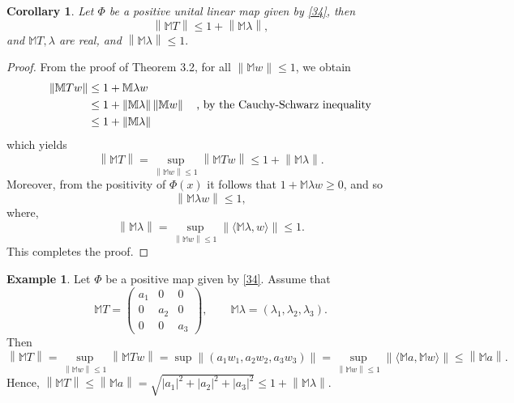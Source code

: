 \documentclass[11pt,reqno]{amsart}
\newtheorem{corollary}[subsection]{Corollary}
\theoremstyle{definition}
\newtheorem{example}{Example}
\numberwithin{equation}{section} \setcounter{tocdepth}{1}
\def\bm{{\mathbb M}}
\newcommand{\norm}[1]{\left \lVert #1 \right \rVert}
\newcommand{\innerproduct}[1]{\langle #1 \rangle}
\numberwithin{equation}{section}
\begin{document}
\begin{corollary}
     Let $\Phi$ be a positive unital linear map given by \eqref{34}, then
     \begin{equation}
         \norm{\bm{T}}\leq 1+\norm{\bm{\lambda}},
     \end{equation} and $\bm{T, \lambda}$ are real, and $\norm{\bm{\lambda}}\leq 1.$
\end{corollary}
\begin{proof}
    From the proof of Theorem 3.2, for all $\|\bm{w}\|\leq 1$, we obtain
    \begin{align}
          \norm{\bm{Tw}}&\leq 1+\bm{\lambda w} \notag \\
                  &\leq 1+ \norm{\bm{\lambda}}\norm{\bm{w}} \quad \text{, by the Cauchy-Schwarz inequality} \notag\\
          &\leq 1+\norm{\bm{\lambda}} \notag
      \end{align}
  which yields $$\norm{\bm{T}}=\sup_{\norm{\bm{w}}\leq1} \norm{\bm{Tw}} \leq 1+\norm{\bm{\lambda}}.$$
      Moreover, from the positivity of $\Phi(x)$ it follows that  $1+\bm{\lambda w}\geq 0$, and so
      \begin{equation}
          \norm{\bm{\lambda w}} \leq 1,
      \end{equation} where,
      $$ \norm{\bm{\lambda}}=\sup_{\norm{\bm{w}}\leq 1} \norm{\innerproduct{\bm{\lambda,w}}}\leq 1.$$
      This completes the proof.
\end{proof}

\begin{example}
    Let $\Phi$ be a positive map given by \eqref{34}.  Assume that
    \begin{equation}
        \bm{T}=\begin{pmatrix}
    a_1 & 0 & 0\\
    0 & a_2 & 0\\
    0 & 0 & a_3
    \end{pmatrix}, \qquad \bm{\lambda}=(\lambda_1,\lambda_2, \lambda_3).
    \end{equation}
    Then
    \begin{equation}
        \norm{\bm{T}}=\sup_{\norm{\bm{w}} \leq 1} \norm{\bm{Tw}}= \sup \norm{(a_1w_1,a_2w_2,a_3w_3)}=\sup_{\norm{\bm{w}}\leq 1} \norm{ \langle \bm{a}, \bm{w} \rangle} \leq \norm{\bm{a}}.
    \end{equation} Hence, $\norm{\bm{T}} \leq \norm{\bm{a}}=\sqrt{|a_1|^2+|a_2|^2+|a_3|^2} \leq 1+\norm{\bm{\lambda}}.$
\end{example}
\end{document}
